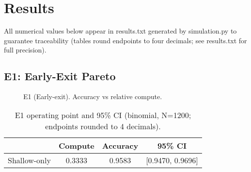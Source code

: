 \section{Results}
\label{sec:results}
All numerical values below appear in results.txt generated by simulation.py to guarantee traceability (tables round endpoints to four decimals; see results.txt for full precision).

\subsection{E1: Early-Exit Pareto}
\begin{figure}[H]
  \centering
  \begin{adjustbox}{width=\linewidth}
  \end{adjustbox}
  \caption{E1 (Early-exit). Accuracy vs relative compute.}
  \label{fig:e1}
\end{figure}

\begin{table}[H]
  \centering
  \caption{E1 operating point and 95\% CI (binomial, N=1200; endpoints rounded to 4 decimals).}
  \vspace{0.25em}
  \begin{adjustbox}{width=\linewidth}
  \begin{tabular}{l c c c}
    \toprule
    & Compute & Accuracy & 95\% CI \\
    \midrule
    Shallow-only & 0.3333 & 0.9583 & [0.9470, 0.9696] \\
    \bottomrule
  \end{tabular}
  \end{adjustbox}
\end{table}

